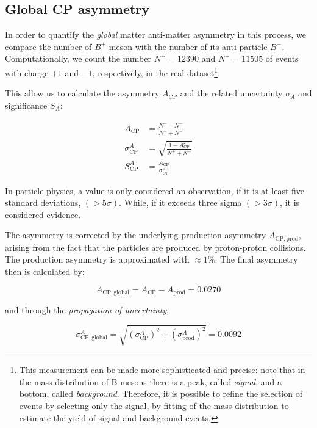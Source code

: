 \subsection{Global CP asymmetry}\label{sec:globCP}

In order to quantify the \emph{global} matter anti-matter asymmetry in this process, we compare the number of $B^{+}$ meson with the number of its anti-particle $B^{-}$.
Computationally, we count the number $N^{+}=12390$ and $N^{-}=11505$ of events with charge $+1$ and $-1$, respectively, in the real dataset\footnote{This measurement can be made more sophisticated and precise: note that in the mass distribution of B mesons there is a peak, called \emph{signal}, and a bottom, called \emph{background}. Therefore, it is possible to refine the selection of events by selecting only the signal, by fitting of the mass distribution to estimate the yield of signal and background events.}.

This allow us to calculate the asymmetry $A_{\mathrm{CP}}$ and the related uncertainty $\sigma_{A}$ and significance $S_{A}$:

\begin{align}
    A_{\mathrm{CP}} &= \frac{N^{+} - N^{-}}{N^{+} + N^{-}}\label{eq:asym} \\[0.5cm]
    \sigma_{\mathrm{CP}}^{A} &= \sqrt{\frac{1 - A_{\mathrm{CP}}^{2}}{N^{+} + N^{-}}}\label{eq:unce} \\[0.5cm]
    S_{\mathrm{CP}}^{A} &= \frac{A_{\mathrm{CP}}}{\sigma_{\mathrm{CP}}^{A}}\label{eq:sign}
\end{align}

In particle physics, a value is only considered an observation, if it is at least five standard deviations, $(> 5\sigma)$. While, if it exceeds three sigma $(> 3\sigma)$, it is considered evidence.

The asymmetry is corrected by the underlying production asymmetry $A_{\mathrm{CP, prod}}$, arising from the fact that the particles are produced by proton-proton collisions.
The production asymmetry is approximated with $\approx 1\%$.
The final asymmetry then is calculated by:

\begin{equation}
    A_{\mathrm{CP, global}} = A_{\mathrm{CP}} - A_{\mathrm{prod}} = 0.0270
\end{equation}

and through the \emph{propagation of uncertainty},

\begin{equation}
    \sigma_{\mathrm{CP, global}}^{A} = \sqrt{(\sigma_{\mathrm{CP}}^{A})^2 + (\sigma_{\mathrm{prod}}^{A})^2} = 0.0092 
\end{equation}

